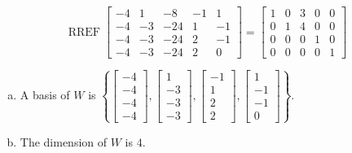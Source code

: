 \begin{exerciseAnswer} 


\[\operatorname{RREF} \left[\begin{array}{ccccc}
-4 & 1 & -8 & -1 & 1 \\
-4 & -3 & -24 & 1 & -1 \\
-4 & -3 & -24 & 2 & -1 \\
-4 & -3 & -24 & 2 & 0
\end{array}\right] = \left[\begin{array}{ccccc}
1 & 0 & 3 & 0 & 0 \\
0 & 1 & 4 & 0 & 0 \\
0 & 0 & 0 & 1 & 0 \\
0 & 0 & 0 & 0 & 1
\end{array}\right] \]


\begin{enumerate}[(a)]
\item A basis of \(W\) is \( \left\{ \left[\begin{array}{c}
-4 \\
-4 \\
-4 \\
-4
\end{array}\right] , \left[\begin{array}{c}
1 \\
-3 \\
-3 \\
-3
\end{array}\right] , \left[\begin{array}{c}
-1 \\
1 \\
2 \\
2
\end{array}\right] , \left[\begin{array}{c}
1 \\
-1 \\
-1 \\
0
\end{array}\right] \right\} \).
\item The dimension of \(W\) is \( 4 \).
\end{enumerate}
    
\end{exerciseAnswer}
    
